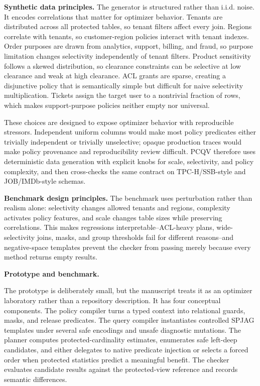 \documentclass[conference]{IEEEtran}
\newcommand{\pcqv}{PCQV}
\begin{document}
\noindent\textbf{Synthetic data principles.}
The generator is structured rather than i.i.d. noise. It encodes correlations that matter for optimizer behavior. Tenants are distributed across all protected tables, so tenant filters affect every join. Regions correlate with tenants, so customer-region policies interact with tenant indexes. Order purposes are drawn from analytics, support, billing, and fraud, so purpose limitation changes selectivity independently of tenant filters. Product sensitivity follows a skewed distribution, so clearance constraints can be selective at low clearance and weak at high clearance. ACL grants are sparse, creating a disjunctive policy that is semantically simple but difficult for naive selectivity multiplication. Tickets assign the target user to a nontrivial fraction of rows, which makes support-purpose policies neither empty nor universal.

These choices are designed to expose optimizer behavior with reproducible stressors. Independent uniform columns would make most policy predicates either trivially independent or trivially unselective; opaque production traces would make policy provenance and reproducibility review difficult. \pcqv{} therefore uses deterministic data generation with explicit knobs for scale, selectivity, and policy complexity, and then cross-checks the same contract on TPC-H/SSB-style and JOB/IMDb-style schemas.


\noindent\textbf{Benchmark design principles.}
The benchmark uses perturbation rather than realism alone: selectivity changes allowed tenants and regions, complexity activates policy features, and scale changes table sizes while preserving correlations. This makes regressions interpretable--ACL-heavy plans, wide-selectivity joins, masks, and group thresholds fail for different reasons--and negative-space templates prevent the checker from passing merely because every method returns empty results.


\noindent\textbf{Prototype and benchmark.}
\label{sec:implementation}

The prototype is deliberately small, but the manuscript treats it as an optimizer laboratory rather than a repository description. It has four conceptual components. The policy compiler turns a typed context into relational guards, masks, and release predicates. The query compiler instantiates controlled SPJAG templates under several safe encodings and unsafe diagnostic mutations. The planner computes protected-cardinality estimates, enumerates safe left-deep candidates, and either delegates to native predicate injection or selects a forced order when protected statistics predict a meaningful benefit. The checker evaluates candidate results against the protected-view reference and records semantic differences.
\end{document}
